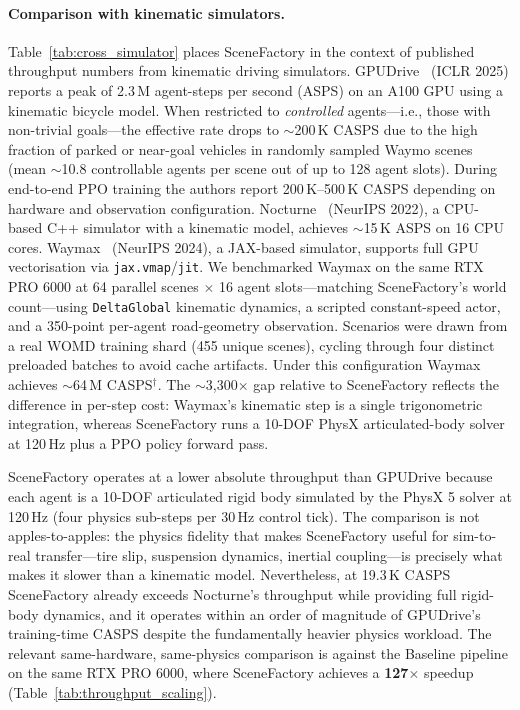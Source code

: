 \paragraph{Comparison with kinematic simulators.}
Table~\ref{tab:cross_simulator} places SceneFactory in the context of published throughput numbers from kinematic driving simulators.
GPUDrive~\cite{kazemkhani_gpudrive_2025} (ICLR 2025) reports a peak of 2.3\,M agent-steps per second (ASPS) on an A100 GPU using a kinematic bicycle model.
When restricted to \emph{controlled} agents---i.e., those with non-trivial goals---the effective rate drops to $\sim$200\,K CASPS due to the high fraction of parked or near-goal vehicles in randomly sampled Waymo scenes (mean $\sim$10.8 controllable agents per scene out of up to 128 agent slots).
During end-to-end PPO training the authors report 200\,K--500\,K CASPS depending on hardware and observation configuration.
Nocturne~\cite{vinitsky_nocturne_2022} (NeurIPS 2022), a CPU-based C++ simulator with a kinematic model, achieves $\sim$15\,K ASPS on 16 CPU cores.
Waymax~\cite{gulino_waymax_2023} (NeurIPS 2024), a JAX-based simulator, supports full GPU vectorisation via \texttt{jax.vmap}/\texttt{jit}. We benchmarked Waymax on the same RTX PRO 6000 at 64 parallel scenes $\times$ 16 agent slots---matching SceneFactory's world count---using \texttt{DeltaGlobal} kinematic dynamics, a scripted constant-speed actor, and a 350-point per-agent road-geometry observation. Scenarios were drawn from a real WOMD training shard (455 unique scenes), cycling through four distinct preloaded batches to avoid cache artifacts. Under this configuration Waymax achieves $\sim$64\,M CASPS$^\dagger$. The $\sim$3{,}300$\times$ gap relative to SceneFactory reflects the difference in per-step cost: Waymax's kinematic step is a single trigonometric integration, whereas SceneFactory runs a 10-DOF PhysX articulated-body solver at 120\,Hz plus a PPO policy forward pass.

SceneFactory operates at a lower absolute throughput than GPUDrive because each agent is a 10-DOF articulated rigid body simulated by the PhysX 5 solver at 120\,Hz (four physics sub-steps per 30\,Hz control tick).
The comparison is not apples-to-apples: the physics fidelity that makes SceneFactory useful for sim-to-real transfer---tire slip, suspension dynamics, inertial coupling---is precisely what makes it slower than a kinematic model.
Nevertheless, at 19.3\,K CASPS SceneFactory already exceeds Nocturne's throughput while providing full rigid-body dynamics, and it operates within an order of magnitude of GPUDrive's training-time CASPS despite the fundamentally heavier physics workload.
The relevant same-hardware, same-physics comparison is against the Baseline pipeline on the same RTX PRO 6000, where SceneFactory achieves a \textbf{127$\times$} speedup (Table~\ref{tab:throughput_scaling}).

